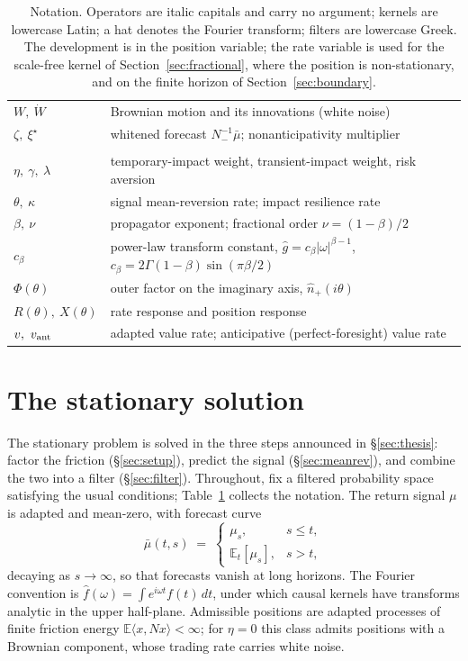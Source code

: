 \documentclass[11pt]{article}
\newcommand{\E}{\mathbb{E}}
\theoremstyle{plain}
\theoremstyle{definition}
\theoremstyle{remark}
\begin{document}
\begin{table}[t]
\begin{tabularx}{\textwidth}{@{}lX@{}}
$W,\ \dot W$ & Brownian motion and its innovations (white noise) \\
$\zeta,\ \xi^\star$ & whitened forecast $N_-^{-1}\bar\mu$; nonanticipativity multiplier \\
\addlinespace
\multicolumn{2}{@{}l}{\emph{Scalars}}\\
$\eta,\ \gamma,\ \lambda$ & temporary-impact weight, transient-impact weight, risk aversion \\
$\theta,\ \kappa$ & signal mean-reversion rate; impact resilience rate \\
$\beta,\ \nu$ & propagator exponent; fractional order $\nu=(1-\beta)/2$ \\
$c_\beta$ & power-law transform constant, $\hat g=c_\beta|\omega|^{\beta-1}$, $c_\beta=2\Gamma(1-\beta)\sin(\pi\beta/2)$ \\
$\Phi(\theta)$ & outer factor on the imaginary axis, $\hat n_+(i\theta)$ \\
$R(\theta),\ X(\theta)$ & rate response and position response \\
$v,\ v_{\rm ant}$ & adapted value rate; anticipative (perfect-foresight) value rate \\
\bottomrule
\end{tabularx}
\caption{Notation. Operators are italic capitals and carry no argument; kernels are lowercase Latin; a hat denotes the Fourier transform; filters are lowercase Greek. The development is in the position variable; the rate variable is used for the scale-free kernel of Section~\ref{sec:fractional}, where the position is non-stationary, and on the finite horizon of Section~\ref{sec:boundary}.}
\label{tab:notation}
\end{table}

\section{The stationary solution}\label{sec:interior}

The stationary problem is solved in the three steps announced in \S\ref{sec:thesis}: factor the friction (\S\ref{sec:setup}), predict the signal (\S\ref{sec:meanrev}), and combine the two into a filter (\S\ref{sec:filter}). Throughout, fix a filtered probability space satisfying the usual conditions; Table~\ref{tab:notation} collects the notation. The return signal $\mu$ is adapted and mean-zero, with forecast curve
\[
\bar\mu(t,s) \;=\; \begin{cases}\mu_s, & s\le t,\\[2pt] \E_t[\mu_s], & s>t,\end{cases}
\]
decaying as $s\to\infty$, so that forecasts vanish at long horizons. The Fourier convention is $\hat f(\omega)=\int e^{i\omega t}f(t)\,dt$, under which causal kernels have transforms analytic in the upper half-plane. Admissible positions are adapted processes of finite friction energy $\E\langle x,Nx\rangle<\infty$; for $\eta=0$ this class admits positions with a Brownian component, whose trading rate carries white noise.
\end{document}
